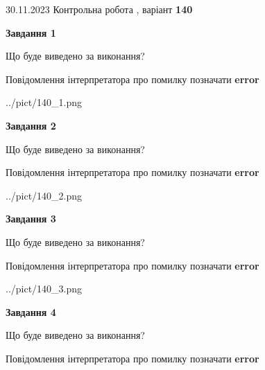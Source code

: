 \documentclass[12pt, ukrainian]{article}
\begin{document}
{{30.11.2023 Контрольна робота , варіант  \No \textbf { 140 }\par}}
{




{\begin {center}\textbf{Завдання 1}\end {center}}\par
Що буде виведено за виконання? \par
Повідомлення інтерпретатора про помилку позначати \textbf{error}

\begin{center}
	{../pict/140_1.png}
\end{center}
\newpage

{\begin {center}\textbf{Завдання 2}\end {center}}\par
Що буде виведено за виконання? \par
Повідомлення інтерпретатора про помилку позначати \textbf{error}

\begin{center}
	{../pict/140_2.png}
\end{center}
\newpage

{\begin {center}\textbf{Завдання 3}\end {center}}\par
Що буде виведено за виконання? \par
Повідомлення інтерпретатора про помилку позначати \textbf{error}

\begin{center}
	{../pict/140_3.png}
\end{center}
\newpage

{\begin {center}\textbf{Завдання 4}\end {center}}\par
Що буде виведено за виконання? \par
Повідомлення інтерпретатора про помилку позначати \textbf{error}

}
\end{document}
